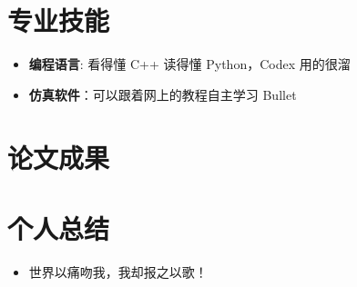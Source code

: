 \documentclass{resume}
\begin{document}
\section{专业技能}
\begin{itemize}
  \item \textbf{编程语言}: 看得懂 C++ 读得懂 Python，Codex 用的很溜
  \item \textbf{仿真软件}：可以跟着网上的教程自主学习 Bullet 
\end{itemize}

\section{论文成果}
\renewcommand\refname{\vskip -0.305cm}


\nocite{*}

\section{个人总结}
\begin{itemize}
  \item 世界以痛吻我，我却报之以歌！
\end{itemize}
\end{document}
